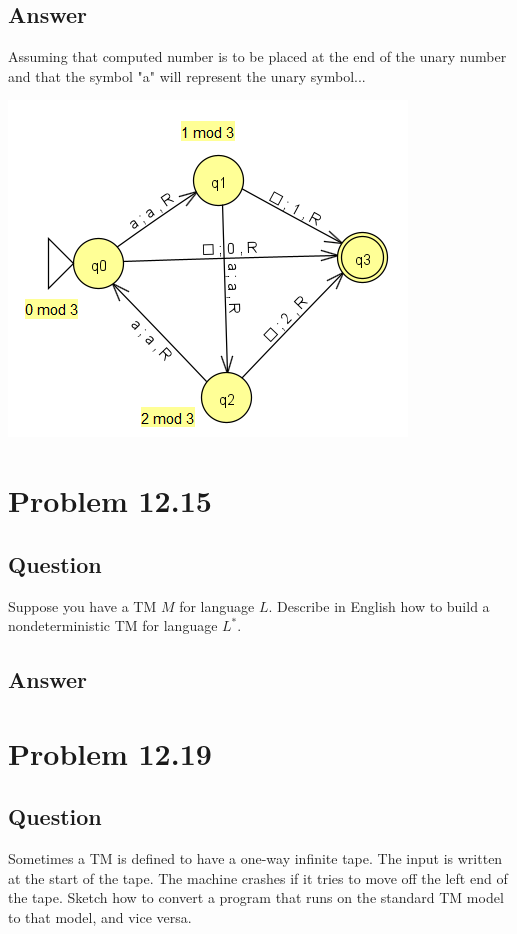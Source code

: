 \documentclass[12pt, a4paper]{article}
\begin{document}
\subsection{Answer}
Assuming that computed number is to be placed at the end of the unary number and that the symbol "a" will represent the unary symbol...
\begin{center}
\includegraphics[scale=1]{12.3c}
\end{center}

\section{Problem 12.15}
\subsection{Question}
Suppose you have a TM $M$ for language $L$. Describe in English how to build a nondeterministic TM for language $L^{*}$.
\subsection{Answer}

\section{Problem 12.19}
\subsection{Question}
Sometimes a TM is defined to have a one-way infinite tape. The input is written at the start of the tape. The machine crashes if it tries to move off the left end of the tape.\newline
Sketch how to convert a program that runs on the standard TM model to that model, and vice versa.
\end{document}
